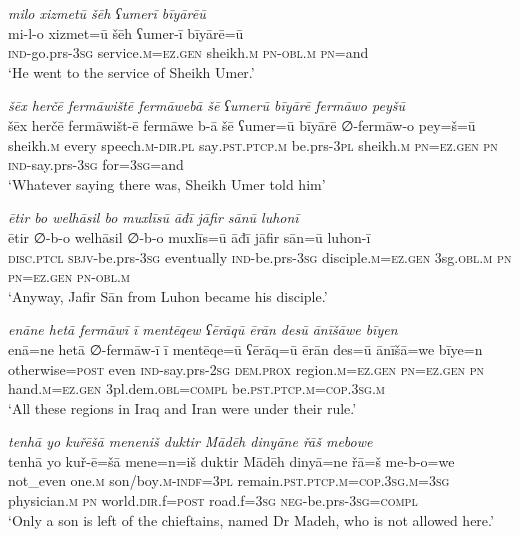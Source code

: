 \ea \label{ŠJ.83}
\textit{milo xizmetū šēh ʕumerī bīyārēū} \\ 
\gll mi-l-o xizmet=ū šēh ʕumer-ī bīyārē=ū \\ 
 \textsc{ind-}go.prs\textsc{-3sg} service\textsc{.m}\textsc{=ez.gen} sheikh\textsc{.m} \textsc{pn}\textsc{-obl}\textsc{.m} \textsc{pn}=and \\ 
\glt `He went to the service of Sheikh Umer.'
\z 
 
\ea \label{ŠJ.94}
\textit{šēx herčē fermāwištē fermāwebā šē ʕumerū bīyārē fermāwo peyšū} \\ 
\gll šēx herčē fermāwišt-ē fermāwe b-ā šē ʕumer=ū bīyārē ∅-fermāw-o pey=š=ū \\ 
 sheikh\textsc{.m} every speech\textsc{.m}\textsc{-dir}\textsc{.pl} say\textsc{.pst}\textsc{.ptcp}\textsc{.m} be.prs\textsc{-3pl} sheikh\textsc{.m} \textsc{pn}\textsc{=ez.gen} \textsc{pn} \textsc{ind-}say.prs\textsc{-3sg} for\textsc{=3sg}=and \\ 
\glt `Whatever saying there was, Sheikh Umer told him'
\z 
 
\ea \label{ŠJ.97}
\textit{ētir bo welhāsil bo muxlīsū āđī jāfir sānū luhonī} \\ 
\gll ētir ∅-b-o welhāsil ∅-b-o muxlīs=ū āđī jāfir sān=ū luhon-ī \\ 
 \textsc{disc.ptcl} \textsc{sbjv-}be.prs\textsc{-3sg} eventually \textsc{ind-}be.prs\textsc{-3sg} disciple\textsc{.m}\textsc{=ez.gen} 3sg\textsc{.obl}\textsc{.m} \textsc{pn} \textsc{pn}\textsc{=ez.gen} \textsc{pn}\textsc{-obl}\textsc{.m} \\ 
\glt `Anyway, Jafir Sān from Luhon became his disciple.'
\z 
 
\ea \label{ŠJ.102}
\textit{enāne hetā fermāwī ī mentēqew ʕērāqū ērān desū ānīšāwe bīyen} \\ 
\gll enā=ne hetā ∅-fermāw-ī ī mentēqe=ū ʕērāq=ū ērān des=ū ānīšā=we bīye=n \\ 
 otherwise\textsc{=\textsc{post}} even \textsc{ind-}say.prs-\textsc{2sg} \textsc{dem.prox} region\textsc{.m}\textsc{=ez.gen} \textsc{pn}\textsc{=ez.gen} \textsc{pn} hand\textsc{.m}\textsc{=ez.gen} 3pl.dem\textsc{.obl}\textsc{=compl} be\textsc{.pst}\textsc{.ptcp}\textsc{.m}\textsc{=cop}\textsc{.3sg}\textsc{.m} \\ 
\glt `All these regions in Iraq and Iran were under their rule.'
\z 
 
\ea \label{ŠJ.105}
\textit{tenhā yo kuřēšā meneniš duktir Mādēh dinyāne řāš mebowe} \\ 
\gll tenhā yo kuř-ē=šā mene=n=iš duktir Mādēh dinyā=ne řā=š me-b-o=we \\ 
 not\_even one\textsc{.m} son/boy\textsc{.m}\textsc{-indf}\textsc{=3pl} remain\textsc{.pst}\textsc{.ptcp}\textsc{.m}\textsc{=cop}\textsc{.3sg}\textsc{.m}\textsc{=3sg} physician\textsc{.m} \textsc{pn} world\textsc{.dir}.f\textsc{=\textsc{post}} road.f\textsc{=3sg} \textsc{neg-}be.prs\textsc{-3sg}\textsc{=compl} \\ 
\glt `Only a son is left of the chieftains, named Dr Madeh, who is not allowed here.'
\z 
 
